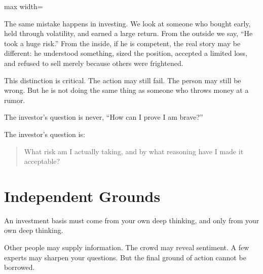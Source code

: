 \begin{center}
\begin{adjustbox}{max width=\linewidth}
\end{adjustbox}
\end{center}

The same mistake happens in investing. We look at someone who bought early, held through volatility, and earned a large return. From the outside we say, ``He took a huge risk.'' From the inside, if he is competent, the real story may be different: he understood something, sized the position, accepted a limited loss, and refused to sell merely because others were frightened.

This distinction is critical. The action may still fail. The person may still be wrong. But he is not doing the same thing as someone who throws money at a rumor.

The investor's question is never, ``How can I prove I am brave?''

The investor's question is:

\begin{quote}
What risk am I actually taking, and by what reasoning have I made it acceptable?
\end{quote}

\section*{Independent Grounds}

An investment basis must come from your own deep thinking, and only from your own deep thinking.

Other people may supply information. The crowd may reveal sentiment. A few experts may sharpen your questions. But the final ground of action cannot be borrowed.

